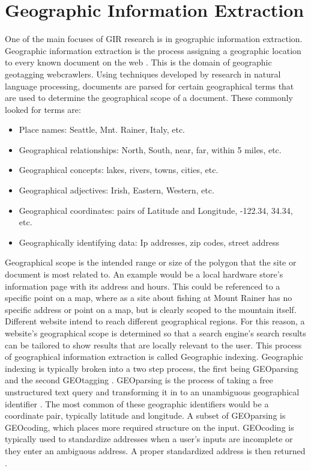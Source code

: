 \documentclass[10pt, conference, compsocconf]{IEEEtran}
\begin{document}
\section{Geographic Information Extraction}
One of the main focuses of GIR research is in geographic information extraction. Geographic information extraction is the process assigning a geographic location to every known document on the web \cite{Purves:2018ke}. This is the domain of geographic geotagging webcrawlers. Using techniques developed by research in natural language processing, documents are parsed for certain geographical terms that are used to determine the geographical scope of a document. These commonly looked for terms are:
\begin{itemize}
    \item Place names: Seattle, Mnt. Rainer, Italy, etc.
    \item Geographical relationships: North, South, near, far, within 5 miles, etc.
    \item Geographical concepts: lakes, rivers, towns, cities, etc.
    \item Geographical adjectives: Irish, Eastern, Western, etc.
    \item Geographical coordinates: pairs of Latitude and Longitude, -122.34, 34.34, etc.
    \item Geographically identifying data: Ip addresses, zip codes, street address
\end{itemize}
Geographical scope is the intended range or size of the polygon that the site or document is most related to. An example would be a local hardware store's information page with its address and hours. This could be referenced to a specific point on a map, where as a site about fishing at Mount Rainer has no specific address or point on a map, but is clearly scoped to the mountain itself. Different website intend to reach different geographical regions. For this reason, a website's geographical scope is determined so that a search engine's search results can be tailored to show results that are locally relevant to the user. This process of geographical information extraction is called Geographic indexing. Geographic indexing is typically broken into a two step process, the first being GEOparsing and the second GEOtagging \cite{Larson:1996wq}. GEOparsing is the process of taking a free unstructured text query and transforming it in to an unambiguous geographical identifier \cite{Jones:2008isa}. The most common of these geographic identifiers would be a coordinate pair, typically latitude and longitude. A subset of GEOparsing is GEOcoding, which places more required structure on the input. GEOcoding is typically used to standardize addresses when a user's inputs are incomplete or they enter an ambiguous address. A proper standardized address is then returned \cite{Purves:2018ke}. 
\end{document}
